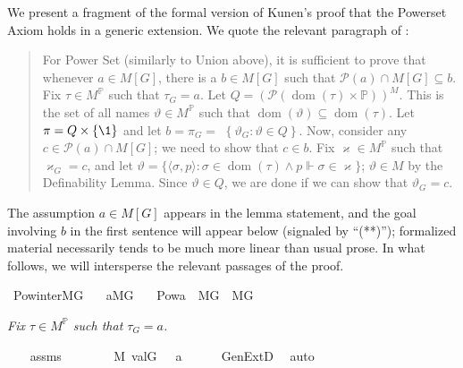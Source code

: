We present a fragment of the formal version of Kunen's proof that the
Powerset Axiom holds in a generic extension. We quote the relevant
paragraph of \cite[Thm.~IV.2.27]{kunen2011set}:
\begin{quote}
  For Power Set (similarly to Union above), it is sufficient to prove
  that whenever $a \in M[G]$, there is a $b \in M[G]$ such that
  $\mathcal{P}(a) \cap M[G] \subseteq b$. Fix $\tau \in
  M^{\mathbb{P}}$ such that $\tau_{G}=a$. Let
  $Q=(\mathcal{P}(\operatorname{dom}(\tau) \times
  \mathbb{P}))^{M}$. This is the set of all names $\vartheta \in
  M^{\mathbb{P}}$ such that $\operatorname{dom}(\vartheta) \subseteq
  \operatorname{dom}(\tau)$. Let $\pi=Q \times\{\1\}$ and let
  $b=\pi_{G}=$ $\left\{\vartheta_{G}: \vartheta \in Q\right\}$. Now,
  consider any $c \in \mathcal{P}(a) \cap M[G]$; we need to show that
  $c \in b$. Fix $\varkappa \in M^{\mathbb{P}}$ such that
  $\varkappa_{G}=c$, and let $\vartheta=\{\langle\sigma, p\rangle:
  \sigma \in \operatorname{dom}(\tau) \wedge p \Vdash \sigma \in
  \varkappa\}$; $\vartheta \in M$ by the Definability Lemma. Since
  $\vartheta \in Q$, we are done if we can show that
  $\vartheta_{G}=c$.
\end{quote}
The assumption $a\in M[G]$ appears in the lemma statement, and the
goal involving $b$ in the first sentence will appear below (signaled
by “{\small (**)}”); formalized
material necessarily tends to be much more linear than usual prose. In
what follows, we
will intersperse the relevant passages of the proof.
\begin{isabelle}
\isamarkupfalse%
\ Pow{\isacharunderscore}{\kern0pt}inter{\isacharunderscore}{\kern0pt}MG{\isacharcolon}{\kern0pt}\isanewline
\ \ \ {\isachardoublequoteopen}a{\isasymin}M{\isacharbrackleft}{\kern0pt}G{\isacharbrackright}{\kern0pt}{\isachardoublequoteclose}\isanewline
\ \ \ {\isachardoublequoteopen}Pow{\isacharparenleft}{\kern0pt}a{\isacharparenright}{\kern0pt}\ {\isasyminter}\ M{\isacharbrackleft}{\kern0pt}G{\isacharbrackright}{\kern0pt}\ {\isasymin}\ M{\isacharbrackleft}{\kern0pt}G{\isacharbrackright}{\kern0pt}{\isachardoublequoteclose}\isanewline
%
\isamarkupfalse%
\ {\isacharminus}{\kern0pt}
\end{isabelle}
\textit{Fix $\tau \in  M^{\mathbb{P}}$ such that $\tau_{G}=a$.}
\begin{isabelle}
\ \ \isamarkupfalse%
\ assms\isanewline
\ \ \isamarkupfalse%
\ {\isasymtau}\ \ {\isachardoublequoteopen}{\isasymtau}\ {\isasymin}\ M{\isachardoublequoteclose}\ {\isachardoublequoteopen}val{\isacharparenleft}{\kern0pt}G{\isacharcomma}{\kern0pt}\ {\isasymtau}{\isacharparenright}{\kern0pt}\ {\isacharequal}{\kern0pt}\ a{\isachardoublequoteclose}\isanewline
\ \ \ \ \isamarkupfalse%
\ GenExtD\ \isamarkupfalse%
\ auto
\end{isabelle}
